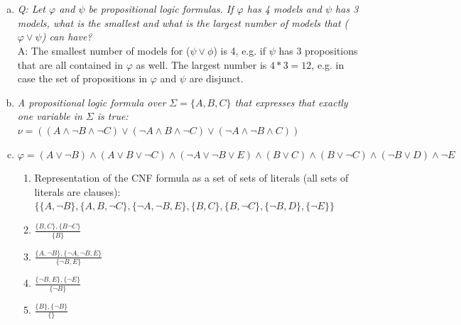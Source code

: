 \documentclass{article} %
\begin{document}
\section{}
\begin{enumerate}[(a)]
    \item \textit{Q: Let $\varphi$ and $\psi$ be propositional logic formulas.
    If $\varphi$ has 4 models and $\psi$ has 3 models, what is the
    smallest and what is the largest number of models that
    ($\varphi \lor \psi$) can have?}\\[0.5em]
    A: The smallest number of models for ($\psi \lor \phi$) is 4, e.g.
    if $\psi$ has 3 propositions that are all contained in $\varphi$ as well.
    The largest number is $4 * 3 = 12$, e.g. in case the set of propositions
    in $\varphi$ and $\psi$ are disjunct.
    \item \textit{A propositional logic formula over $\Sigma = \{ A, B, C \}$
    that expresses that exactly one variable in $\Sigma$ is true:}\\[0.5em]
    $\nu = ((A \land \lnot B \land \lnot C) \lor (\lnot A \land B \land \lnot C) \lor (\lnot A \land \lnot B \land C))$
    \item $\varphi = (A \lor \lnot B) \land (A \lor B \lor \lnot C) \land (\lnot A \lor \lnot B \lor E) \land (B \lor C)
    \land (B \lor \lnot C) \land (\lnot B \lor D) \land \lnot E$
    \begin{enumerate}[1.]
        \item Representation of the CNF formula as a set of sets of literals (all sets of literals are clauses):\\[0.5em]
        $\{
            \{ A, \lnot B \},
            \{ A, B, \lnot C \},
            \{ \lnot A, \lnot B, E \},
            \{ B, C \},
            \{ B, \lnot C \},
            \{ \lnot B, D \},
            \{ \lnot E \}
        \}$
        \item $\frac{\displaystyle \{ B, C \}, \{ B \lnot C \}}
        {\displaystyle \{ B \}}$
        \item $\frac{\displaystyle \{ A, \lnot B \}, \{ \lnot A, \lnot B, E \}}
        {\displaystyle \{ \lnot B, E \}}$
        \item $\frac{\displaystyle \{ \lnot B, E \}, \{ \lnot E \}}{\displaystyle \{ \lnot B \}}$
        \item $\frac{\displaystyle \{ B \}, \{ \lnot B \}}{\displaystyle \{ \}}$
    \end{enumerate}
\end{enumerate}
\end{document}
